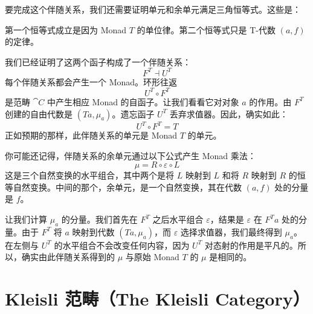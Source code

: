 要完成这个伴随关系，我们还需要证明单元和余单元满足三角恒等式。这些是：

\begin{figure}[H]
  \centering
  \begin{subfigure}
    \centering
  \end{subfigure}%
  \hspace{1cm}
  \begin{subfigure}
    \centering
  \end{subfigure}
\end{figure}

\noindent
第一个恒等式成立是因为 Monad $T$ 的单位律。第二个恒等式只是 T-代数 $(a, f)$ 的定律。

我们已经证明了这两个函子构成了一个伴随关系：
\[F^T \dashv U^T\]
每个伴随关系都会产生一个 Monad。环形往返
\[U^T \circ F^T\]
是范畴 $\cat{C}$ 中产生相应 Monad 的自函子。让我们看看它对对象 $a$ 的作用。由 $F^T$ 创建的自由代数是 $(T a, \mu_a)$。遗忘函子 $U^T$ 丢弃求值器。因此，确实如此：
\[U^T \circ F^T = T\]
正如预期的那样，此伴随关系的单元是 Monad $T$ 的单元。

你可能还记得，伴随关系的余单元通过以下公式产生 Monad 乘法：
\[\mu = R \circ \varepsilon \circ L\]
这是三个自然变换的水平组合，其中两个是将 $L$ 映射到 $L$ 和将 $R$ 映射到 $R$ 的恒等自然变换。中间的那个，余单元，是一个自然变换，其在代数 $(a, f)$ 处的分量是 $f$。

让我们计算 $\mu_a$ 的分量。我们首先在 $F^T$ 之后水平组合 $\varepsilon$，结果是 $\varepsilon$ 在 $F^T a$ 处的分量。由于 $F^T$ 将 $a$ 映射到代数 $(T a, \mu_a)$，而 $\varepsilon$ 选择求值器，我们最终得到 $\mu_a$。在左侧与 $U^T$ 的水平组合不会改变任何内容，因为 $U^T$ 对态射的作用是平凡的。所以，确实由此伴随关系得到的 $\mu$ 与原始 Monad $T$ 的 $\mu$ 是相同的。

\section{Kleisli 范畴（The Kleisli Category）}

